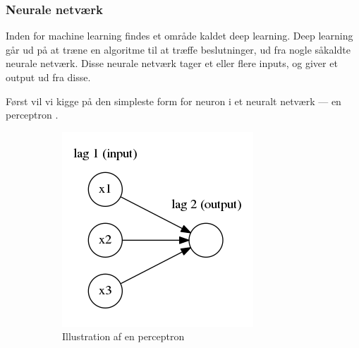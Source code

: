 \subsubsection{Neurale netværk}
Inden for machine learning findes et område kaldet deep learning. Deep learning går ud på at træne en algoritme til at træffe beslutninger, ud fra nogle såkaldte neurale netværk. Disse neurale netværk tager et eller flere inputs, og giver et output ud fra disse. 

Først vil vi kigge på den simpleste form for neuron i et neuralt netværk --- en perceptron \cite{neural}.
\FloatBarrier
\begin{figure}[h!]
    \centering
    \begin{subfigure}[b]{0.4\textwidth}
        \includegraphics[width=\textwidth]{images/neural1.png}
		\caption{Illustration af en perceptron}
		\label{fig:perceptron}
    \end{subfigure}
    ~ %
    \begin{subfigure}[b]{0.4\textwidth}

\end{subfigure}
\end{figure}
